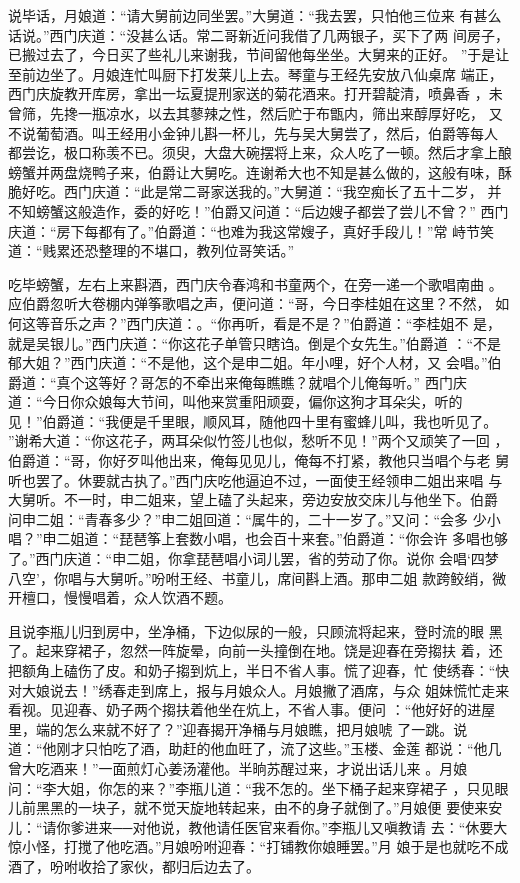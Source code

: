 说毕话，月娘道：“请大舅前边同坐罢。”大舅道：“我去罢，只怕他三位来
有甚么话说。”西门庆道：“没甚么话。常二哥新近问我借了几两银子，买下了两
间房子，已搬过去了，今日买了些礼儿来谢我，节间留他每坐坐。大舅来的正好。
”于是让至前边坐了。月娘连忙叫厨下打发莱儿上去。琴童与王经先安放八仙桌席
端正，西门庆旋教开库房，拿出一坛夏提刑家送的菊花酒来。打开碧靛清，喷鼻香
，未曾筛，先搀一瓶凉水，以去其蓼辣之性，然后贮于布甑内，筛出来醇厚好吃，
又不说葡萄酒。叫王经用小金钟儿斟一杯儿，先与吴大舅尝了，然后，伯爵等每人
都尝讫，极口称羡不已。须臾，大盘大碗摆将上来，众人吃了一顿。然后才拿上酿
螃蟹并两盘烧鸭子来，伯爵让大舅吃。连谢希大也不知是甚么做的，这般有味，酥
脆好吃。西门庆道：“此是常二哥家送我的。”大舅道：“我空痴长了五十二岁，
并不知螃蟹这般造作，委的好吃！”伯爵又问道：“后边嫂子都尝了尝儿不曾？”
西门庆道：“房下每都有了。”伯爵道：“也难为我这常嫂子，真好手段儿！”常
峙节笑道：“贱累还恐整理的不堪口，教列位哥笑话。”

吃毕螃蟹，左右上来斟酒，西门庆令春鸿和书童两个，在旁一递一个歌唱南曲
。应伯爵忽听大卷棚内弹筝歌唱之声，便问道：“哥，今日李桂姐在这里？不然，
如何这等音乐之声？”西门庆道：。“你再听，看是不是？”伯爵道：“李桂姐不
是，就是吴银儿。”西门庆道：“你这花子单管只瞎诌。倒是个女先生。”伯爵道
：“不是郁大姐？”西门庆道：“不是他，这个是申二姐。年小哩，好个人材，又
会唱。”伯爵道：“真个这等好？哥怎的不牵出来俺每瞧瞧？就唱个儿俺每听。”
西门庆道：“今日你众娘每大节间，叫他来赏重阳顽耍，偏你这狗才耳朵尖，听的
见！”伯爵道：“我便是千里眼，顺风耳，随他四十里有蜜蜂儿叫，我也听见了。
”谢希大道：“你这花子，两耳朵似竹签儿也似，愁听不见！”两个又顽笑了一回
，伯爵道：“哥，你好歹叫他出来，俺每见见儿，俺每不打紧，教他只当唱个与老
舅听也罢了。休要就古执了。”西门庆吃他逼迫不过，一面使王经领申二姐出来唱
与大舅听。不一时，申二姐来，望上磕了头起来，旁边安放交床儿与他坐下。伯爵
问申二姐：“青春多少？”申二姐回道：“属牛的，二十一岁了。”又问：“会多
少小唱？”申二姐道：“琵琶筝上套数小唱，也会百十来套。”伯爵道：“你会许
多唱也够了。”西门庆道：“申二姐，你拿琵琶唱小词儿罢，省的劳动了你。说你
会唱‘四梦八空’，你唱与大舅听。”吩咐王经、书童儿，席间斟上酒。那申二姐
款跨鲛绡，微开檀口，慢慢唱着，众人饮酒不题。

且说李瓶儿归到房中，坐净桶，下边似尿的一般，只顾流将起来，登时流的眼
黑了。起来穿裙子，忽然一阵旋晕，向前一头撞倒在地。饶是迎春在旁搊扶
着，还把额角上磕伤了皮。和奶子搊到炕上，半日不省人事。慌了迎春，忙
使绣春：“快对大娘说去！”绣春走到席上，报与月娘众人。月娘撇了酒席，与众
姐妹慌忙走来看视。见迎春、奶子两个搊扶着他坐在炕上，不省人事。便问
：“他好好的进屋里，端的怎么来就不好了？”迎春揭开净桶与月娘瞧，把月娘唬
了一跳。说道：“他刚才只怕吃了酒，助赶的他血旺了，流了这些。”玉楼、金莲
都说：“他几曾大吃酒来！”一面煎灯心姜汤灌他。半晌苏醒过来，才说出话儿来
。月娘问：“李大姐，你怎的来？”李瓶儿道：“我不怎的。坐下桶子起来穿裙子
，只见眼儿前黑黑的一块子，就不觉天旋地转起来，由不的身子就倒了。”月娘便
要使来安儿：“请你爹进来──对他说，教他请任医官来看你。”李瓶儿又嗔教请
去：“休要大惊小怪，打搅了他吃酒。”月娘吩咐迎春：“打铺教你娘睡罢。”月
娘于是也就吃不成酒了，吩咐收拾了家伙，都归后边去了。

